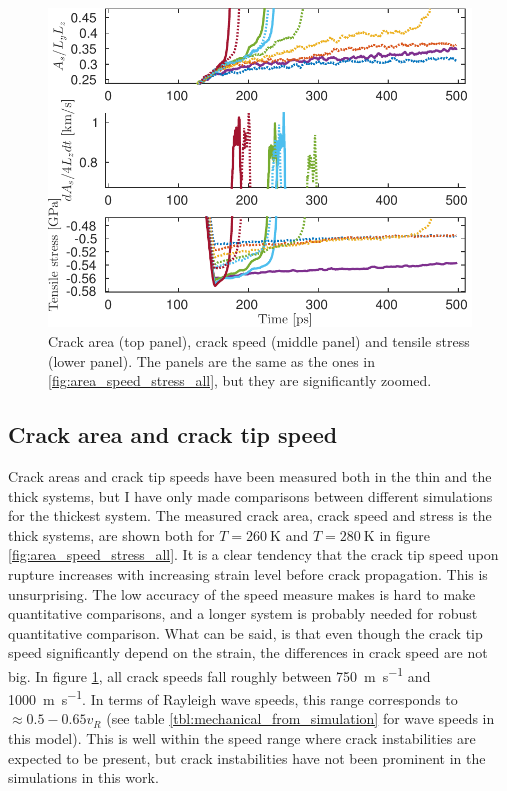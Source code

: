 \begin{figure}
\centering
\includegraphics[width=12cm]{../figures/thesis/area_speed_stress_all_zoomed.pdf}
\caption{Crack area (top panel), crack speed (middle panel) and tensile stress (lower panel). The panels are the same as the ones in \ref{fig:area_speed_stress_all}, but they are significantly zoomed.}
\label{fig:area_speed_stress_zoom}
\end{figure}

\subsection{Crack area and crack tip speed}
Crack areas and crack tip speeds have been measured both in the thin and the thick systems, but I have only made comparisons between different simulations for the thickest system. The measured crack area, crack speed and stress is the thick systems, are shown both for $T=\SI{260}{\kelvin}$ and $T=\SI{280}{\kelvin}$ in figure \ref{fig:area_speed_stress_all}. It is a clear tendency that the crack tip speed upon rupture increases with increasing strain level before crack propagation. This is unsurprising. The low accuracy of the speed measure makes is hard to make quantitative comparisons, and a longer system is probably needed for robust quantitative comparison. What can be said, is that even though the crack tip speed significantly depend on the strain, the differences in crack speed are not big. In figure \ref{fig:area_speed_stress_zoom}, all crack speeds fall roughly between \SI{750}{\meter\per\second} and \SI{1000}{\meter\per\second}. In terms of Rayleigh wave speeds, this range corresponds to $\approx 0.5 - 0.65 v_R$ (see table \ref{tbl:mechanical_from_simulation} for wave speeds in this model). This is well within the speed range where crack instabilities are expected to be present, but crack instabilities have not been prominent in the simulations in this work.

